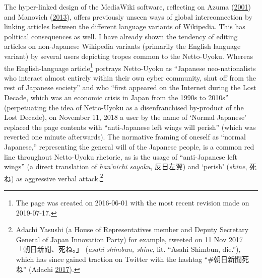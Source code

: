 \documentclass[10pt,british,A4paper,,openany]{memoir}
\begin{document}
The hyper-linked design of the MediaWiki software, reflecting on Azuma
(\protect\hyperlink{ref-azuma_otaku:_2001}{2001}) and Manovich
(\protect\hyperlink{ref-manovich_software_2013}{2013}), offers
previously unseen ways of global interconnection by linking articles
between the different language variants of Wikipedia. This has political
consequences as well. I have already shown the tendency of editing
articles on non-Japanese Wikipedia variants (primarily the English
language variant) by several users depicting tropes common to the
Netto-Uyoku. Whereas the English-language article\footnote{The page was
  created on 2016-06-01 with the most recent revision made on
  2019-07-17.} portrays Netto-Uyoku as ``Japanese neo-nationalists who
interact almost entirely within their own cyber community, shut off from
the rest of Japanese society'' and who ``first appeared on the Internet
during the Lost Decade, which was an economic crisis in Japan from the
1990s to 2010s'' (perpetuating the idea of Netto-Uyoku as a
disenfranchised by-product of the Lost Decade), on November 11, 2018 a
user by the name of `Normal Japanese' replaced the page contents with
``anti-Japanese left wings will perish'' (which was reverted one minute
afterwards). The normative framing of oneself as ``normal Japanese,''
representing the general will of the Japanese people, is a common red
line throughout Netto-Uyoku rhetoric, as is the usage of ``anti-Japanese
left wings'' (a direct translation of \emph{han'nichi sayoku}, 反日左翼)
and `perish' (\emph{shine}, 死ね) as aggressive verbal attack.\footnote{Adachi
  Yasushi (a House of Representatives member and Deputy Secretary
  General of Japan Innovation Party) for example, tweeted on 11 Nov 2017
  「朝日新聞、死ね。」 (\emph{asahi shimbun, shine}, lit. ``Asahi
  Shimbun, die.''), which has since gained traction on Twitter with the
  hashtag ``\#朝日新聞死ね'' (Adachi
  \protect\hyperlink{ref-adachi_eng._2017}{2017}).}
\end{document}
